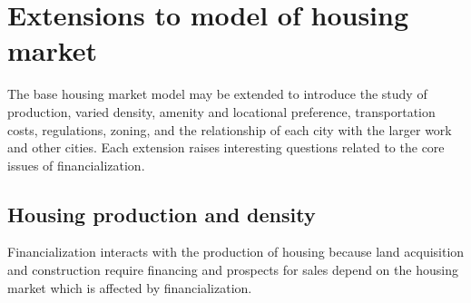 



\section{Extensions to model of housing market}
The base housing market model may be extended to introduce the study of production, varied density, amenity and locational preference, transportation costs, regulations, zoning, and the relationship of each city with the larger work and other cities. Each extension raises interesting questions related to the core issues of financialization.

\subsection{Housing production and density}

Financialization interacts with the production of housing because land acquisition and construction require financing and prospects for sales depend on the housing market which is affected by financialization.

